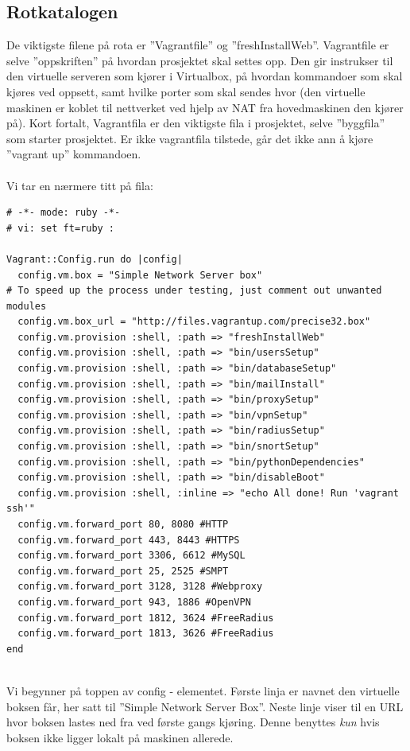 \documentclass{article}
\begin{document}
\subsection{Rotkatalogen}
De viktigste filene på rota er ''Vagrantfile'' og ''freshInstallWeb''.
Vagrantfile er selve ''oppskriften'' på hvordan prosjektet skal settes opp. Den gir instrukser til den virtuelle serveren som kjører i Virtualbox, på hvordan kommandoer som skal kjøres ved oppsett, samt hvilke porter som skal sendes hvor (den virtuelle maskinen er koblet til nettverket ved hjelp av NAT fra hovedmaskinen den kjører på). Kort fortalt, Vagrantfila er den viktigste fila i prosjektet, selve ''byggfila'' som starter prosjektet. Er ikke vagrantfila tilstede, går det ikke ann å kjøre ''vagrant up'' kommandoen. 
\\ \\
\newpage
Vi tar en nærmere titt på fila:
\begin{lstlisting}
# -*- mode: ruby -*-
# vi: set ft=ruby :

Vagrant::Config.run do |config|
  config.vm.box = "Simple Network Server box"
# To speed up the process under testing, just comment out unwanted modules
  config.vm.box_url = "http://files.vagrantup.com/precise32.box"
  config.vm.provision :shell, :path => "freshInstallWeb"
  config.vm.provision :shell, :path => "bin/usersSetup"
  config.vm.provision :shell, :path => "bin/databaseSetup"
  config.vm.provision :shell, :path => "bin/mailInstall"
  config.vm.provision :shell, :path => "bin/proxySetup"
  config.vm.provision :shell, :path => "bin/vpnSetup"
  config.vm.provision :shell, :path => "bin/radiusSetup"
  config.vm.provision :shell, :path => "bin/snortSetup"
  config.vm.provision :shell, :path => "bin/pythonDependencies"
  config.vm.provision :shell, :path => "bin/disableBoot"
  config.vm.provision :shell, :inline => "echo All done! Run 'vagrant ssh'"
  config.vm.forward_port 80, 8080 #HTTP
  config.vm.forward_port 443, 8443 #HTTPS
  config.vm.forward_port 3306, 6612 #MySQL
  config.vm.forward_port 25, 2525 #SMPT
  config.vm.forward_port 3128, 3128 #Webproxy
  config.vm.forward_port 943, 1886 #OpenVPN
  config.vm.forward_port 1812, 3624 #FreeRadius
  config.vm.forward_port 1813, 3626 #FreeRadius
end
\end{lstlisting}
\\ 
Vi begynner på toppen av config - elementet. Første linja er navnet den virtuelle boksen får, her satt til ''Simple Network Server Box''. 
Neste linje viser til en URL hvor boksen lastes ned fra ved første gangs kjøring. Denne benyttes \textit{kun} hvis boksen ikke ligger lokalt på maskinen allerede.
\end{document}
